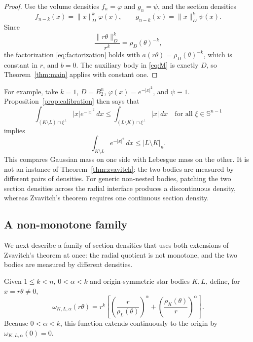 \documentclass{amsart}
\theoremstyle{remark}
\newcommand{\Sph}{\mathbb{S}}
\newcommand{\dd}{\,d}
\newcommand{\vol}[2][n]{\lvert #2\rvert_{#1}}
\begin{document}
\begin{proof}
Use the volume densities $f_n=\varphi$ and $g_n=\psi$, and the section
densities
\[
 f_{n-k}(x)=\lVert x\rVert_D^k\varphi(x),
 \qquad
 g_{n-k}(x)=\lVert x\rVert_D^k\psi(x).
\]
Since
\[
 \frac{\lVert r\theta\rVert_D^k}{r^k}
 =\rho_D(\theta)^{-k},
\]
the factorization \eqref{eq:factorization} holds with
$a(r\theta)=\rho_D(\theta)^{-k}$, which is constant in $r$, and $b=0$. The
auxiliary body in \eqref{eq:M} is exactly $D$, so Theorem~\ref{thm:main}
applies with constant one.
\end{proof}

For example, take $k=1$, $D=B_2^n$, $\varphi(x)=e^{-|x|^2}$, and
$\psi\equiv1$. Proposition~\ref{prop:calibration} then says that
\begin{equation}\label{eq:gaussian-sections}
 \int_{(K\setminus L)\cap\xi^\perp}|x|e^{-|x|^2}\dd x
 \leq
 \int_{(L\setminus K)\cap\xi^\perp}|x|\dd x
 \quad\text{for all }\xi\in\Sph^{n-1}
\end{equation}
implies
\begin{equation}\label{eq:gaussian-example}
 \int_{K\setminus L}e^{-|x|^2}\dd x
 \leq\vol{L\setminus K}.
\end{equation}
This compares Gaussian mass on one side with Lebesgue mass on the other. It
is not an instance of Theorem~\ref{thm:zvavitch}: the two bodies are measured
by different pairs of densities. For generic non-nested bodies, patching the
two section densities across the radial interface produces a discontinuous
density, whereas Zvavitch's theorem requires one continuous section density.

\subsection{A non-monotone family}

We next describe a family of section densities that uses both extensions of
Zvavitch's theorem at once: the radial quotient is not monotone, and the two
bodies are measured by different densities.

Given $1\leq k<n$, $0<\alpha<k$ and origin-symmetric star bodies $K,L$,
define, for $x=r\theta\neq0$,
\begin{equation}\label{eq:omega}
 \omega_{K,L,\alpha}(r\theta)
 =r^k\left[
       \left(\frac{r}{\rho_L(\theta)}\right)^\alpha
       +\left(\frac{\rho_K(\theta)}{r}\right)^\alpha
     \right].
\end{equation}
Because $0<\alpha<k$, this function extends continuously to the origin by
$\omega_{K,L,\alpha}(0)=0$.
\end{document}
